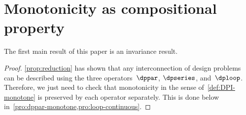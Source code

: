 
\section{Monotonicity as compositional property}

The first main result of this paper is an invariance result.

\noindent
{}

\begin{proof}
    \cref{prop:reduction} has shown that any interconnection of design
    problems can be described using the three operators~$\dppar$, $\dpseries$,
    and~$\dploop$. Therefore, we just need to check that monotonicity
    in the sense of~\cref{def:DPI-monotone} is preserved by each operator
    separately. This is done below in~\cref{pro:dppar-monotone,pro:loop-continuous}.
\end{proof}

